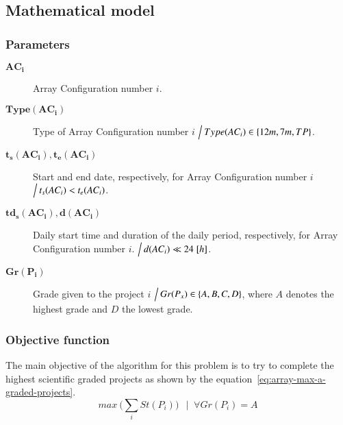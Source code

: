 \subsection{Mathematical model}

\subsubsection{Parameters}
\begin{description}
\item[$\mathbf{AC_i}$] Array Configuration number $i$.

\item[$\mathbf{Type(AC_i)}$] Type of Array Configuration number $i$ $\Big\slash\: Type(AC_i) \in \{12m, 7m, TP\}$.

\item[$\mathbf{t_s(AC_i), t_e(AC_i)}$] Start and end date, respectively, for Array Configuration number $i$ $\Big\slash\: t_s(AC_i) < t_e(AC_i)$.

\item[$\mathbf{td_s(AC_i), d(AC_i)}$] Daily start time and duration of the daily period, respectively, for Array Configuration number $i$. $\Big\slash\: d(AC_i) \ll 24\;[h]$.

\item[$\mathbf{Gr(P_i)}$] Grade given to the project $i$ $\Big\slash\: Gr(P_x) \in \{A,B,C,D\}$, where $A$ denotes the highest grade and $D$ the lowest grade.
\end{description}

\subsubsection{Objective function}
The main objective of the algorithm for this problem is to try to complete the highest scientific graded projects as shown by the equation~\ref{eq:array-max-a-graded-projects}.
\begin{equation}
\label{eq:array-max-a-graded-projects}
max \: \bigg(\sum_{i} St(P_i)\bigg) \:\: \mid\; \forall Gr(P_i) = A
\end{equation}

